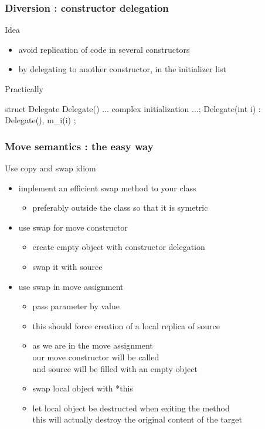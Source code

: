 \begin{frame}[fragile]
  \frametitle{Diversion : constructor delegation}
  \begin{block}{Idea}
    \begin{itemize}
    \item avoid replication of code in several constructors
    \item by delegating to another constructor, in the initializer list
    \end{itemize}
  \end{block}
  \begin{exampleblock}{Practically}
    \begin{cppcode}
      struct Delegate {
        Delegate() { ... complex initialization ...};
        Delegate(int i) : Delegate(), m_i(i) {};
      }
    \end{cppcode}
  \end{exampleblock}
\end{frame}

\begin{frame}[fragile]
  \frametitle{Move semantics : the easy way}
  \begin{block}{Use copy and swap idiom}
    \begin{itemize}
    \item implement an efficient swap method to your class
      \begin{itemize}
      \item preferably outside the class so that it is symetric
      \end{itemize}
    \item use swap for move constructor
      \begin{itemize}
      \item create empty object with constructor delegation
      \item swap it with source
      \end{itemize}
    \item use swap in move assignment
      \begin{itemize}
      \item pass parameter by value
      \item this should force creation of a local replica of source
      \item as we are in the move assignment \\
        our move constructor will be called \\
        and source will be filled with an empty object
      \item swap local object with *this
      \item let local object be destructed when exiting the method \\
        this will actually destroy the original content of the target
      \end{itemize}
    \end{itemize}
  \end{block}
\end{frame}

